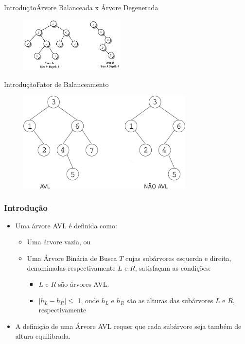 \documentclass[aspectratio=169]{beamer}
\begin{document}
\begin{frame}{Introdução}{Árvore Balanceada x Árvore Degenerada}
\begin{figure}[!h]
  \centering
   \includegraphics[width=150pt]{imagens/degenerated_tree.png}
  \label{fig_degenerated_tre}
\end{figure}
\end{frame}



\begin{frame}{Introdução}{Fator de Balanceamento}
\begin{figure}[!h]
  \centering
   \includegraphics[width=250pt]{imagens/exemplo_avl.png}
  \label{fig_exemplo_avl}
\end{figure}
\end{frame}


\begin{frame}
\frametitle{Introdução}
\begin{itemize}
 \item Uma árvore AVL é definida como:
\begin{itemize}
\item Uma árvore vazia, ou
\item Uma Árvore Binária de Busca $T$ cujas subárvores esquerda e direita, denominadas respectivamente $L$ e $R$, satisfaçam as condições:
\begin{itemize}
\item $L$ e $R$ são árvores AVL.
\item $|h_L - h_R| \leq$ 1, onde $h_L$ e $h_R$ são as alturas das subárvores $L$ e $R$, respectivamente
\end{itemize}
\end{itemize}
\item A definição de uma Árvore AVL requer que cada subárvore seja também de altura equilibrada.
\end{itemize}
\end{frame}
\end{document}

